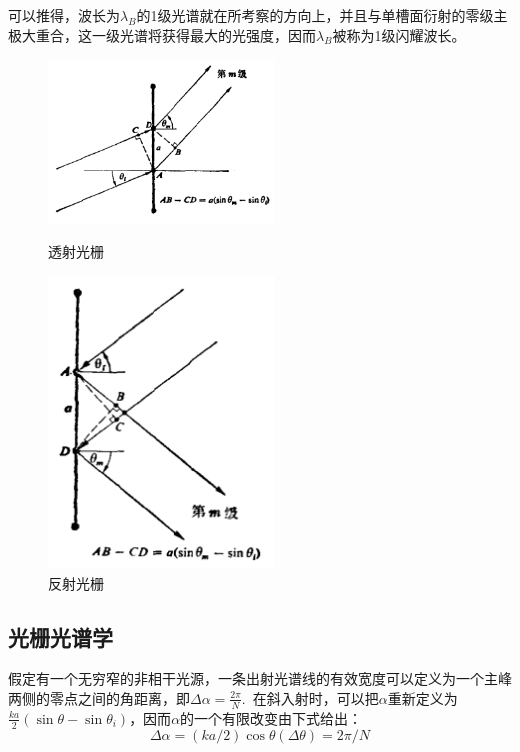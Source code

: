 \documentclass[UTF8]{ctexart}
\begin{document}
\noindent 可以推得，波长为$ \lambda_{B} $的1级光谱就在所考察的方向上，并且与单槽面衍射的零级主极大重合，这一级光谱将获得最大的光强度，因而$ \lambda_{B} $被称为1级闪耀波长。
\begin{figure}[H]
	\centering
	\begin{minipage}[t]{0.48 \textwidth}
		\centering
		\includegraphics[width=6cm]{Diffraction_shan_t.png}
		\caption{透射光栅}
		\label{figure_shan_t}
	\end{minipage}
	\begin{minipage}[t]{0.48 \textwidth}
		\centering
		\includegraphics[width=6cm]{Diffraction_shan_r.png}
		\caption{反射光栅}
		\label{figure_shan_r}
	\end{minipage}
\end{figure}

	\subsection{光栅光谱学}
	假定有一个无穷窄的非相干光源，一条出射光谱线的有效宽度可以定义为一个主峰两侧的零点之间的角距离，即$ \Delta \alpha = \frac{2 \pi}{N} $.\ 在斜入射时，可以把$ \alpha $重新定义为$ \frac{k a}{2} (\sin \theta - \sin \theta_{i}) $，因而$ \alpha $的一个有限改变由下式给出：
	\begin{equation}
	\Delta \alpha=(k a / 2) \cos \theta(\Delta \theta)=2 \pi / N
	\end{equation}
	
\end{document}
